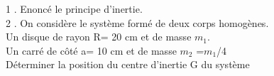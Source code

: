 \documentclass[12pt]{article}
\begin{document}
          1 . Enoncé le principe d’inertie.
          \\2 . On considère le système formé de deux corps homogènes.
                \\Un disque de rayon R= 20 cm et de masse $m_1$.
                \\Un carré de côté a= 10 cm et de masse $m_2$ =$m_1$/4
                \\Déterminer la position du centre d'inertie G du système
\end{document}
